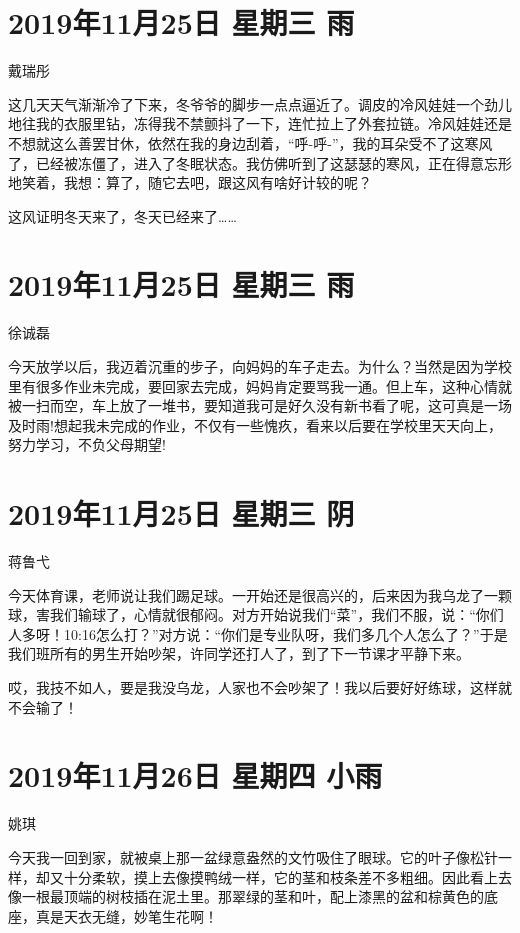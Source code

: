 \section{2019年11月25日 星期三 雨}

戴瑞彤

这几天天气渐渐冷了下来，冬爷爷的脚步一点点逼近了。调皮的冷风娃娃一个劲儿地往我的衣服里钻，冻得我不禁颤抖了一下，连忙拉上了外套拉链。冷风娃娃还是不想就这么善罢甘休，依然在我的身边刮着，``呼-呼-''，我的耳朵受不了这寒风了，已经被冻僵了，进入了冬眠状态。我仿佛听到了这瑟瑟的寒风，正在得意忘形地笑着，我想：算了，随它去吧，跟这风有啥好计较的呢？

这风证明冬天来了，冬天已经来了\ldots\ldots{}

\section{2019年11月25日 星期三 雨}

徐诚磊

今天放学以后，我迈着沉重的步子，向妈妈的车子走去。为什么？当然是因为学校里有很多作业未完成，要回家去完成，妈妈肯定要骂我一通。但上车，这种心情就被一扫而空，车上放了一堆书，要知道我可是好久没有新书看了呢，这可真是一场及时雨!想起我未完成的作业，不仅有一些愧疚，看来以后要在学校里天天向上，努力学习，不负父母期望!

\section{2019年11月25日 星期三 阴}

蒋鲁弋

今天体育课，老师说让我们踢足球。一开始还是很高兴的，后来因为我乌龙了一颗球，害我们输球了，心情就很郁闷。对方开始说我们``菜''，我们不服，说：``你们人多呀！10:16怎么打？''对方说：``你们是专业队呀，我们多几个人怎么了？''于是我们班所有的男生开始吵架，许同学还打人了，到了下一节课才平静下来。

哎，我技不如人，要是我没乌龙，人家也不会吵架了！我以后要好好练球，这样就不会输了！

\section{2019年11月26日 星期四 小雨}

姚琪

今天我一回到家，就被桌上那一盆绿意盎然的文竹吸住了眼球。它的叶子像松针一样，却又十分柔软，摸上去像摸鸭绒一样，它的茎和枝条差不多粗细。因此看上去像一根最顶端的树枝插在泥土里。那翠绿的茎和叶，配上漆黑的盆和棕黄色的底座，真是天衣无缝，妙笔生花啊！

